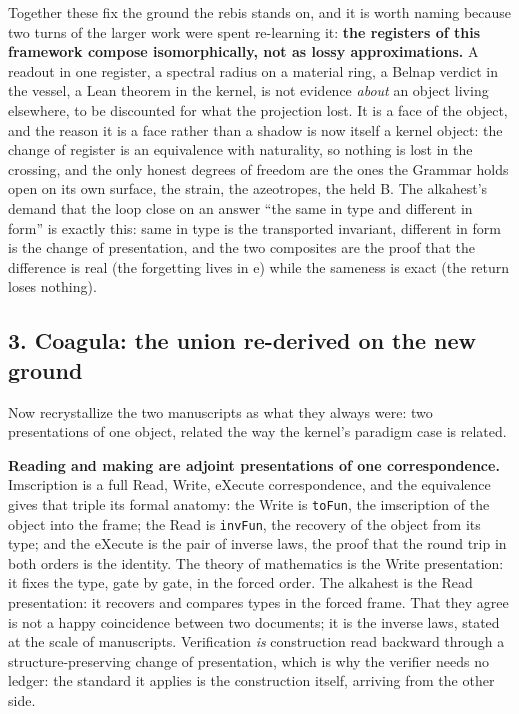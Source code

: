 Together these fix the ground the rebis stands on, and it is worth
naming because two turns of the larger work were spent re-learning it:
\textbf{the registers of this framework compose isomorphically, not as
lossy approximations.} A readout in one register, a spectral radius on a
material ring, a Belnap verdict in the vessel, a Lean theorem in the
kernel, is not evidence \emph{about} an object living elsewhere, to be
discounted for what the projection lost. It is a face of the object, and
the reason it is a face rather than a shadow is now itself a kernel
object: the change of register is an equivalence with naturality, so
nothing is lost in the crossing, and the only honest degrees of freedom
are the ones the Grammar holds open on its own surface, the strain, the
azeotropes, the held B. The alkahest's demand that the loop close on an
answer ``the same in type and different in form'' is exactly this: same
in type is the transported invariant, different in form is the change of
presentation, and the two composites are the proof that the difference
is real (the forgetting lives in e) while the sameness is exact (the
return loses nothing).

\hypertarget{coagula-the-union-re-derived-on-the-new-ground}{%
\subsection{3. Coagula: the union re-derived on the new
ground}\label{coagula-the-union-re-derived-on-the-new-ground}}

Now recrystallize the two manuscripts as what they always were: two
presentations of one object, related the way the kernel's paradigm case
is related.

\textbf{Reading and making are adjoint presentations of one
correspondence.} Imscription is a full Read, Write, eXecute
correspondence, and the equivalence gives that triple its formal
anatomy: the Write is \texttt{toFun}, the imscription of the object into
the frame; the Read is \texttt{invFun}, the recovery of the object from
its type; and the eXecute is the pair of inverse laws, the proof that
the round trip in both orders is the identity. The theory of mathematics
is the Write presentation: it fixes the type, gate by gate, in the
forced order. The alkahest is the Read presentation: it recovers and
compares types in the forced frame. That they agree is not a happy
coincidence between two documents; it is the inverse laws, stated at the
scale of manuscripts. Verification \emph{is} construction read backward
through a structure-preserving change of presentation, which is why the
verifier needs no ledger: the standard it applies is the construction
itself, arriving from the other side.

